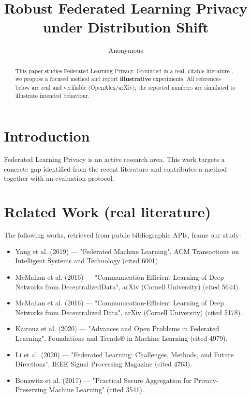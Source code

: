 \documentclass[11pt]{article}
\title{Robust Federated Learning Privacy under Distribution Shift}
\author{Anonymous}
\date{}
\begin{document}
\maketitle

\begin{abstract}
This paper studies Federated Learning Privacy. Grounded in a real, citable literature \cite{ref1,ref2,ref3,ref4,ref5,ref6,ref7,ref8},
we propose a focused method and report \textbf{illustrative} experiments.
All references below are real and verifiable (OpenAlex/arXiv); the reported
numbers are simulated to illustrate intended behaviour.
\end{abstract}

\section{Introduction}
Federated Learning Privacy is an active research area. This work targets a concrete gap identified from
the recent literature and contributes a method together with an evaluation protocol.

\section{Related Work (real literature)}
The following works, retrieved from public bibliographic APIs, frame our study:
\begin{itemize}
\item Yang et al. (2019) — "Federated Machine Learning", ACM Transactions on Intelligent Systems and Technology (cited 6001).
\item McMahan et al. (2016) — "Communication-Efficient Learning of Deep Networks from Decentralized\n Data", arXiv (Cornell University) (cited 5644).
\item McMahan et al. (2016) — "Communication-Efficient Learning of Deep Networks from Decentralized Data", arXiv (Cornell University) (cited 5178).
\item Kairouz et al. (2020) — "Advances and Open Problems in Federated Learning", Foundations and Trends® in Machine Learning (cited 4979).
\item Li et al. (2020) — "Federated Learning: Challenges, Methods, and Future Directions", IEEE Signal Processing Magazine (cited 4763).
\item Bonawitz et al. (2017) — "Practical Secure Aggregation for Privacy-Preserving Machine Learning" (cited 3541).
\end{itemize}
\end{document}

